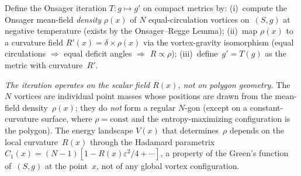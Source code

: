 \begin{corollary}
\label{cor:onsager-contraction}
Define the Onsager iteration $T\colon g \mapsto g'$ on
compact metrics by:
(i)~compute the Onsager mean-field \emph{density}
$\rho(x)$ of $N$ equal-circulation vortices on~$(S,g)$
at negative temperature
(exists by the Onsager--Regge Lemma);
(ii)~map $\rho(x)$ to a curvature field $R'(x) = \delta \times \rho(x)$
via the vortex-gravity isomorphism (equal circulations
$\Rightarrow$ equal deficit angles $\Rightarrow$
$R \propto \rho$);
(iii)~define~$g' = T(g)$ as the metric with curvature~$R'$.

\emph{The iteration operates on the scalar field $R(x)$,
not on polygon geometry.}
The $N$ vortices are individual point masses whose positions
are drawn from the mean-field density~$\rho(x)$;
they do \emph{not} form a regular $N$-gon
(except on a constant-curvature surface, where $\rho = \mathrm{const}$
and the entropy-maximizing configuration is the polygon).
The energy landscape $V(x)$ that determines~$\rho$
depends on the local curvature~$R(x)$ through the
Hadamard parametrix $C_1(x) = (N{-}1)[1 - R(x)\varepsilon^2/4 + \cdots]$, a property of the Green's function of~$(S,g)$ at the point~$x$,
not of any global vortex configuration.


\end{corollary}
